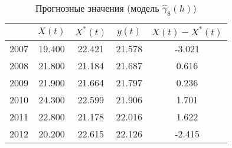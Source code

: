 \begin{table}[ht]
\centering
\begin{tabular}{r|cccc}
  \hline
 & $X(t)$ & $X^{*}(t)$ & $y(t)$ & $ X(t) - X^{*}(t) $ \\ 
  \hline
2007 & 19.400 & 22.421 & 21.578 & -3.021 \\ 
  2008 & 21.800 & 21.184 & 21.687 & 0.616 \\ 
  2009 & 21.900 & 21.664 & 21.797 & 0.236 \\ 
  2010 & 24.300 & 22.599 & 21.906 & 1.701 \\ 
  2011 & 22.800 & 21.178 & 22.016 & 1.622 \\ 
  2012 & 20.200 & 22.615 & 22.126 & -2.415 \\ 
   \hline
\end{tabular}
\caption{Прогнозные значения (модель $ \widehat{\gamma}_8(h) $)} 
\label{table:auto-class-26-prediction}
\end{table}
